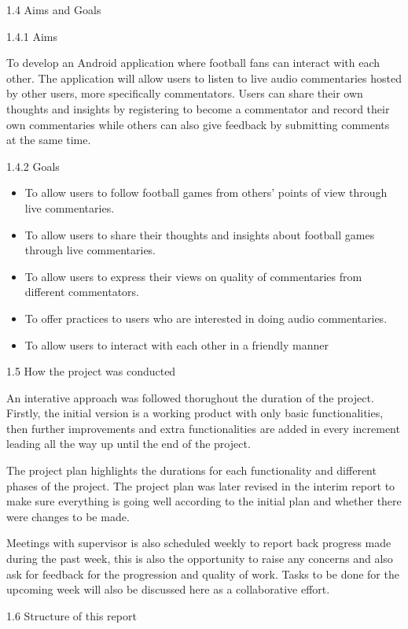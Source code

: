 \documentclass{article}
\begin{document}
\begin{flushleft}
{\Large 1.4 Aims and Goals}\par
{\large 1.4.1 Aims}\par
To develop an Android application where football fans can interact with each other. The application will allow users to listen to live audio commentaries hosted by other users, more specifically commentators. Users can share their own thoughts and insights by registering to become a commentator and record their own commentaries while others can also give feedback by submitting comments at the same time.\par
{\large 1.4.2 Goals}
\begin{itemize}
	\item To allow users to follow football games from others’ points of view through live commentaries.
	\item To allow users to share their thoughts and insights about football games through live commentaries.
	\item To allow users to express their views on quality of commentaries from different commentators.
	\item To offer practices to users who are interested in doing audio commentaries.
	\item To allow users to interact with each other in a friendly manner
\end{itemize}
{\Large 1.5 How the project was conducted}\par
An interative approach was followed thorughout the duration of the project. Firstly, the initial version is a working product with only basic functionalities, then further improvements and extra functionalities are added in every increment leading all the way up until the end of the project.\par
The project plan highlights the durations for each functionality and different phases of the project. The project plan was later revised in the interim report to make sure everything is going well according to the initial plan and whether there were changes to be made.\par
Meetings with supervisor is also scheduled weekly to report back progress made during the past week, this is also the opportunity to raise any concerns and also ask for feedback for the progression and quality of work. Tasks to be done for the upcoming week will also be discussed here as a collaborative effort.\par
{\Large 1.6 Structure of this report}\par

\end{flushleft}
\end{document}
